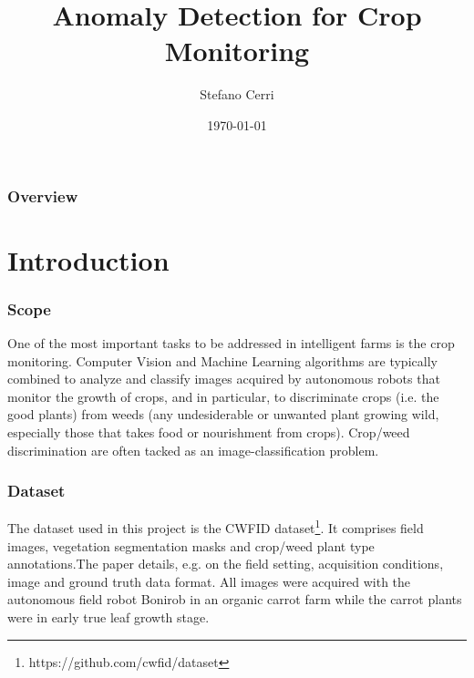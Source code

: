 \documentclass{beamer}
\title[Image Analysis Project]{Anomaly Detection for Crop Monitoring } %
\author{Stefano Cerri} %
\institute[Politecnico Di Milano] %
{
Politecnico di Milano \\ %
\medskip
\textit{stefano1.cerri@mail.polimi.it} %
}
\date{\today} %
\begin{document}
\begin{frame}
\titlepage %
\end{frame}

\begin{frame}
\frametitle{Overview} %
\tableofcontents %
\end{frame}


\section{Introduction} %

\begin{frame}
\frametitle{Scope}
One of the most important tasks to be addressed in intelligent farms is the crop monitoring. Computer Vision and Machine Learning algorithms are typically combined to analyze and classify images acquired by autonomous robots that monitor the growth of crops, and in particular, to discriminate crops (i.e. the good plants) from weeds (any undesiderable or unwanted plant growing wild, especially those that takes food or nourishment from crops). Crop/weed discrimination are often tacked as an image-classification problem.
\end{frame}


\begin{frame}
\frametitle{Dataset}
The dataset used in this project is the CWFID dataset\footnote{https://github.com/cwfid/dataset}. It comprises field images, vegetation segmentation masks and crop/weed plant type annotations.The paper details, e.g. on the field setting, acquisition conditions, image and ground truth data format.
All images were acquired with the autonomous field robot Bonirob in an organic carrot farm while the carrot plants were in early true leaf growth stage.

\end{frame}
\end{document}
